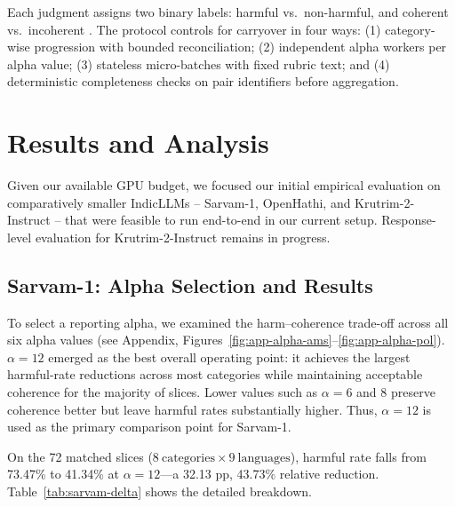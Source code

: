 \documentclass[11pt]{article}
\begin{document}
Each judgment assigns two binary labels: harmful vs.\ non-harmful, and coherent vs.\ incoherent \citep{wei2025systematicevaluationllmasajudgellm,li2024llmsasjudgescomprehensivesurveyllmbased}. The protocol controls for carryover in four ways: (1) category-wise progression with bounded reconciliation; (2) independent alpha workers per alpha value; (3) stateless micro-batches with fixed rubric text; and (4) deterministic completeness checks on pair identifiers before aggregation.

\section{Results and Analysis}

Given our available GPU budget, we focused our initial empirical evaluation on comparatively smaller IndicLLMs -- Sarvam-1, OpenHathi, and Krutrim-2-Instruct -- that were feasible to run end-to-end in our current setup. Response-level evaluation for Krutrim-2-Instruct remains in progress.


\subsection{Sarvam-1: Alpha Selection and Results}

To select a reporting alpha, we examined the harm--coherence trade-off across all six alpha values (see Appendix, Figures~\ref{fig:app-alpha-ams}--\ref{fig:app-alpha-pol}). $\alpha=12$ emerged as the best overall operating point: it achieves the largest harmful-rate reductions across most categories while maintaining acceptable coherence for the majority of slices. Lower values such as $\alpha=6$ and $8$ preserve coherence better but leave harmful rates substantially higher. Thus, $\alpha=12$ is used as the primary comparison point for Sarvam-1.

On the 72 matched slices ($8\ \text{categories} \times 9\ \text{languages}$), harmful rate falls from 73.47\% to 41.34\% at $\alpha=12$---a 32.13 pp, 43.73\% relative reduction. Table~\ref{tab:sarvam-delta} shows the detailed breakdown.
\end{document}
